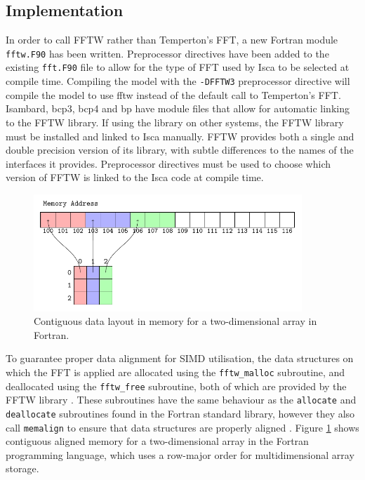 \documentclass[a4paper,11pt]{report}
\begin{document}
\subsection{Implementation}
In order to call FFTW rather than Temperton's FFT, a new Fortran module \texttt{fftw.F90} has been written. Preprocessor directives have been added to the existing \texttt{fft.F90} file to allow for the type of FFT used by Isca to be selected at compile time. Compiling the model with the \texttt{-DFFTW3} preprocessor directive will compile the model to use \gls{fftw} instead of the default call to Temperton's FFT. Isambard, \gls{bcp3}, \gls{bcp4} and \gls{bp} have module files that allow for automatic linking to the FFTW library. If using the library on other systems, the FFTW library must be installed and linked to Isca manually. FFTW provides both a single and double precision version of its library, with subtle differences to the names of the interfaces it provides. Preprocessor directives must be used to choose which version of FFTW is linked to the Isca code at compile time. 
\par
\begin{figure}[htbp]
\begin{center}
\includegraphics[width=0.9\textwidth]{img/tikz-img/data_layout/data_layout.pdf}
\caption[Two-dimensional data layout in Fortran]{Contiguous data layout in memory for a two-dimensional array in Fortran.}
\label{fig:memalign}
\end{center}
\end{figure}
\par
To guarantee proper data alignment for SIMD utilisation, the data structures on which the FFT is applied are allocated using the \texttt{fftw\_malloc} subroutine, and deallocated using the \texttt{fftw\_free} subroutine, both of which are provided by the FFTW library \cite{frigo2005design}. These subroutines have the same behaviour as the \texttt{allocate} and \texttt{deallocate} subroutines found in the Fortran standard library, however they also call \texttt{memalign} to ensure that data structures are properly aligned \cite{frigo2003fftw}. Figure \ref{fig:memalign} shows contiguous aligned memory for a two-dimensional array in the Fortran programming language, which uses a row-major order for multidimensional array storage.
\end{document}
